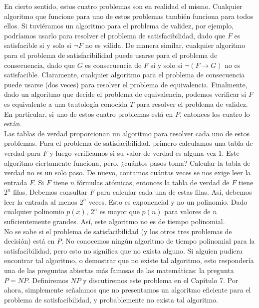 \documentclass[12pt,a4paper]{book}
\begin{document}
    En cierto sentido, estos cuatro problemas son en realidad el mismo. Cualquier algoritmo que funcione para uno de estos
    problemas también funciona para todos ellos. Si tuviéramos un algoritmo para el problema de validez, por ejemplo,
    podríamos usarlo para resolver el problema de satisfacibilidad, dado que $F$ es satisfacible si y solo si $\neg F$ no es
    válida. De manera similar, cualquier algoritmo para el problema de satisfacibilidad puede usarse para el problema de
    consecuencia, dado que $G$ es consecuencia de $F$ si y solo si $\neg(F\rightarrow G)$ no es satisfacible. Claramente,
    cualquier algoritmo para el problema de consecuencia puede usarse (dos veces) para resolver el problema de equivalencia.
    Finalmente, dado un algoritmo que decide el problema de equivalencia, podemos verificar si $F$ es equivalente a una
    tautología conocida $T$ para resolver el problema de validez. En particular, si uno de estos cuatro problemas está en
    $P$, entonces los cuatro lo están.\\
    Las tablas de verdad proporcionan un algoritmo para resolver cada uno de estos problemas. Para el problema de
    satisfacibilidad, primero calculamos una tabla de verdad para $F$ y luego verificamos si su valor de verdad es alguna vez
    1. Este algoritmo ciertamente funciona, pero, ¿cuántos pasos toma? Calcular la tabla de verdad no es un solo paso. De
    nuevo, contamos cuántas veces se nos exige leer la entrada $F$. Si $F$ tiene $n$ fórmulas atómicas, entonces la tabla de
    verdad de $F$ tiene $2^{n}$ filas. Debemos consultar $F$ para calcular cada una de estas filas. Así, debemos leer la
    entrada al menos $2^{n}$ veces. Esto es exponencial y no un polinomio. Dado cualquier polinomio $p(x)$, $2^{n}$ es mayor
    que $p(n)$ para valores de $n$ suficientemente grandes. Así, este algoritmo no es de tiempo polinomial.\\
    No se sabe si el problema de satisfacibilidad (y los otros tres problemas de decisión) está en $P$. No conocemos ningún
    algoritmo de tiempo polinomial para la satisfacibilidad, pero esto no significa que no exista alguno. Si alguien pudiera
    encontrar tal algoritmo, o demostrar que no existe tal algoritmo, esto respondería una de las preguntas abiertas más
    famosas de las matemáticas: la pregunta $P=NP$. Definiremos $NP$ y discutiremos este problema en el Capítulo 7. Por
    ahora, simplemente señalamos que no presentamos un algoritmo eficiente para el problema de satisfacibilidad, y
    probablemente no exista tal algoritmo.\\
\end{document}
